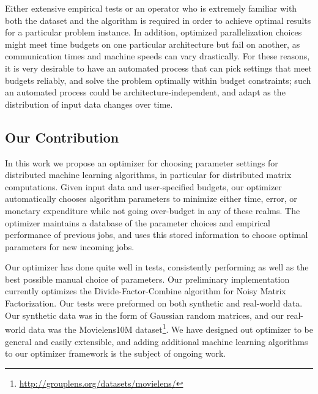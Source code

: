 Either extensive empirical tests or an operator who is extremely 
familiar with both the dataset and the algorithm is required in order 
to achieve optimal results for a particular problem instance. In addition,
optimized parallelization choices might meet time budgets on one particular
architecture but fail on another, as communication times and machine
speeds can vary drastically. For these reasons, it is very desirable 
to have an automated process that can pick settings that meet budgets
reliably, and solve the problem optimally within budget constraints; such
an automated process could be architecture-independent, and adapt 
as the distribution of input data changes over time. 

\subsection{Our Contribution}
In this work we propose an optimizer for choosing parameter settings for 
distributed machine learning algorithms, in particular for distributed 
matrix computations. Given input data and user-specified budgets, our 
optimizer automatically chooses algorithm parameters to minimize either
time, error, or monetary expenditure while not going over-budget in any 
of these realms. The optimizer maintains a database of the parameter 
choices and empirical performance of previous jobs, and uses this stored 
information to choose optimal parameters for new incoming jobs.

Our optimizer has done quite well in tests, consistently performing as 
well as the best possible manual choice of parameters. Our preliminary 
implementation currently optimizes the Divide-Factor-Combine algorithm 
for Noisy Matrix Factorization. Our tests were preformed on both synthetic 
and real-world data. Our synthetic data was in the form of Gaussian 
random matrices, and our real-world data was the Movielens10M 
dataset\footnote{\url{http://grouplens.org/datasets/movielens/}}. We have designed out optimizer to be general and easily 
extensible, and adding additional machine learning algorithms to our 
optimizer framework is the subject of ongoing work.
